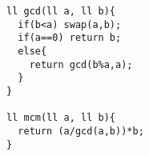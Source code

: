 \begin{verbatim}
ll gcd(ll a, ll b){
  if(b<a) swap(a,b);
  if(a==0) return b;
  else{
    return gcd(b%a,a);
  }
}

ll mcm(ll a, ll b){
  return (a/gcd(a,b))*b;
}
\end{verbatim}